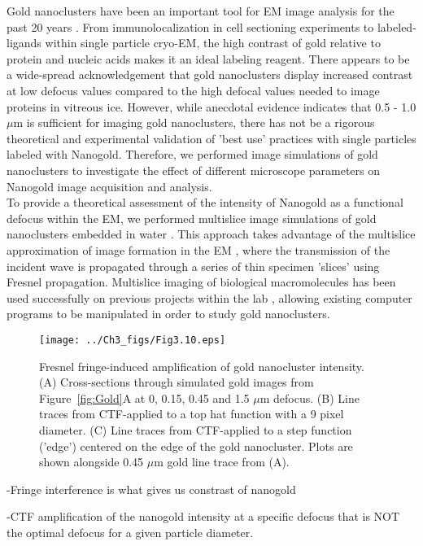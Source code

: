 Gold nanoclusters have been an important tool for EM image analysis for the past 20 years \cite{Hainfeld_2000}. From immunolocalization in cell sectioning experiments to labeled-ligands within single particle cryo-EM, the high contrast of gold relative to protein and nucleic acids makes it an ideal labeling reagent. There appears to be a wide-spread acknowledgement that gold nanoclusters display increased contrast at low defocus values compared to the high defocal values needed to image proteins in vitreous ice. However, while anecdotal evidence indicates that 0.5 - 1.0 $\mu$m is sufficient for imaging gold nanoclusters, there has not be a rigorous theoretical and experimental validation of 'best use' practices with single particles labeled with Nanogold. Therefore, we performed image simulations of gold nanoclusters to investigate the effect of different microscope parameters on Nanogold image acquisition and analysis.\\
\indent To provide a theoretical assessment of the intensity of Nanogold as a functional defocus within the EM, we performed multislice image simulations of gold nanoclusters embedded in water \cite{Goodman,Hall,Kirkland}. This approach takes advantage of the multislice approximation of image formation in the EM \cite{Goodman}, where the transmission of the incident wave is propagated through a series of thin specimen 'slices' using Fresnel propagation. Multislice imaging of biological macromolecules has been used successfully on previous projects within the lab \cite{Hall}, allowing existing computer programs to be manipulated in order to study gold nanoclusters. \\
\begin{figure}
\centering
\texttt{[image: ../Ch3\_figs/Fig3.10.eps]}
\caption[Fresnel fringe-induced amplification of gold nanocluster intensity]{Fresnel fringe-induced amplification of gold nanocluster intensity. (A) Cross-sections through simulated gold images from Figure~\ref{fig:Gold}A at 0, 0.15, 0.45 and 1.5 $\mu$m defocus. (B) Line traces from CTF-applied to a top hat function with a 9 pixel diameter. (C) Line traces from CTF-applied to a step function ('edge') centered on the edge of the gold nanocluster. Plots are shown alongside 0.45 $\mu$m gold line trace from (A).}
\label{fig:Traces}
\end{figure}
 
-Fringe interference is what gives us constrast of nanogold

-CTF amplification of the nanogold intensity at a specific defocus that is NOT the optimal defocus for a given particle diameter.

